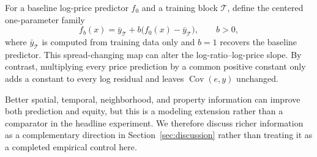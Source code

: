 \documentclass[10pt]{article}
\theoremstyle{definition}
\newcommand{\1}{\mathbf{1}}
\newcommand{\oldtext}[1]{\textcolor{blue}{\sout{#1}}}
\newcommand{\newtext}[1]{\textcolor{impGreen}{#1}}
\begin{document}
\newtext{For a baseline log-price predictor $f_0$ and a training block $\mathcal T$, define the centered one-parameter family
\begin{equation}
\label{eq:centered_recalibration}
f_b(x)
=
\bar y_{\mathcal T}
+
b\bigl(f_0(x)-\bar y_{\mathcal T}\bigr),
\qquad b>0,
\end{equation}
where $\bar y_{\mathcal T}$ is computed from training data only and $b=1$ recovers the baseline predictor. This spread-changing map can alter the log-ratio--log-price slope. By contrast, multiplying every price prediction by a common positive constant only adds a constant to every log residual and leaves $\operatorname{Cov}(e,y)$ unchanged.}



\textcolor{impGreen}{Better spatial, temporal, neighborhood, and property information can improve both prediction and equity, but this is a modeling extension rather than a comparator in the headline experiment. We therefore discuss richer information as a complementary direction in Section~\ref{sec:discussion} rather than treating it as a completed empirical control here.}
\end{document}
